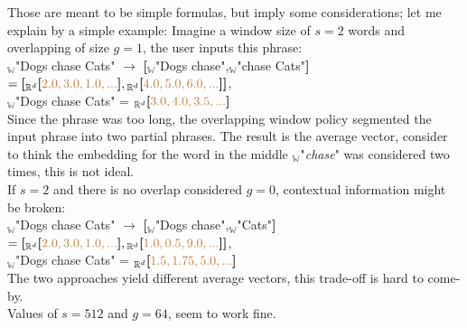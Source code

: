 \documentclass[a4paper,fleqn]{cas-sc}
\begin{document}
Those are meant to be simple formulas, but imply some considerations; let me explain by a simple example: 
Imagine a window size of $s=2$ words and overlapping of size $g=1$, the user inputs this phrase: \\
${}_{\mathbb{W}}$"\color{brown}Dogs chase Cats\color{black}" 
$\rightarrow$ 
\textbf{[}${}_{\mathbb{W}}$"\color{brown}Dogs chase\color{black}",${}_{\mathbb{W}}$"\color{brown}chase Cats\color{black}"\textbf{]} 
$=\textbf{[}{}_{\mathbb{R}^d}\textbf{[}\color{brown}2.0,3.0,1.0,...\color{black}\textbf{]}, 
{}_{\mathbb{R}^d}\textbf{[}\color{brown}4.0,5.0,6.0,...\color{black}\textbf{]}\textbf{]}$, \\
${}_{\mathbb{W}}$"\color{brown}Dogs chase Cats\color{black}" = ${}_{\mathbb{R}^d}\textbf{[}\color{brown}3.0,4.0,3.5,...\color{black}\textbf{]}$\\

\noindent
Since the phrase was too long, the overlapping window policy segmented the input phrase into two partial phrases. 
The result is the average vector, consider to think the embedding for the word in the middle 
${}_{\mathbb{W}}$"\color{brown}\textit{chase}\color{black}" was considered two times, this is not ideal. \\

If $s=2$ and there is no overlap considered $g=0$, contextual information might be broken: \\
${}_{\mathbb{W}}$"\color{brown}Dogs chase Cats\color{black}" 
$\rightarrow$ 
\textbf{[}${}_{\mathbb{W}}$"\color{brown}Dogs chase\color{black}",${}_{\mathbb{W}}$"\color{brown}Cats\color{black}"\textbf{]} 
$=\textbf{[}{}_{\mathbb{R}^d}\textbf{[}\color{brown}2.0,3.0,1.0,...\color{black}\textbf{]}, 
{}_{\mathbb{R}^d}\textbf{[}\color{brown}1.0,0.5,9.0,...\color{black}\textbf{]}\textbf{]}$, \\
${}_{\mathbb{W}}$"\color{brown}Dogs chase Cats\color{black}" = ${}_{\mathbb{R}^d}\textbf{[}\color{brown}1.5,1.75,5.0,...\color{black}\textbf{]}$\\

\noindent
The two approaches yield different average vectors, this trade-off is hard to come-by. \\
Values of $s=512$ and $g=64$, seem to work fine. \\ 
\end{document}
